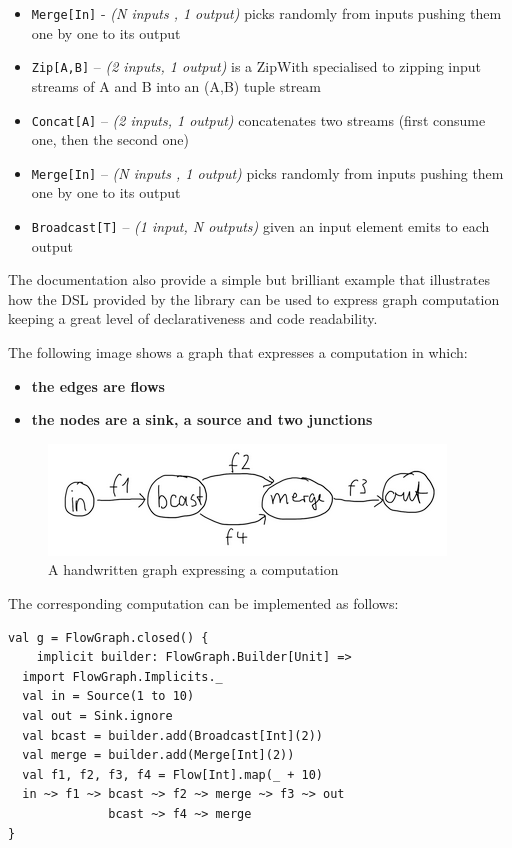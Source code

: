 \begin{itemize}
\itemsep1pt\parskip0pt
\item
  \texttt{Merge{[}In{]}} - \emph{(N inputs , 1 output)} picks randomly
  from inputs pushing them one by one to its output
\item
  \texttt{Zip{[}A,B{]}} -- \emph{(2 inputs, 1 output)} is a ZipWith
  specialised to zipping input streams of A and B into an (A,B) tuple
  stream
\item
  \texttt{Concat{[}A{]}} -- \emph{(2 inputs, 1 output)} concatenates two
  streams (first consume one, then the second one)
\item
  \texttt{Merge{[}In{]}} -- \emph{(N inputs , 1 output)} picks randomly
  from inputs pushing them one by one to its output
\item
  \texttt{Broadcast{[}T{]}} -- \emph{(1 input, N outputs)} given an
  input element emits to each output
\end{itemize}

The documentation also provide a simple but brilliant example that
illustrates how the DSL provided by the library can be used to express
graph computation keeping a great level of declarativeness and code
readability.

The following image shows a graph that expresses a computation in which:

\begin{itemize}
\itemsep1pt\parskip0pt
\item
  \textbf{the edges are flows}
\item
  \textbf{the nodes are a sink, a source and two junctions}
\end{itemize}

\begin{figure}[htbp]
\centering
\includegraphics[scale=0.75]{imgs/graph.png}
\caption{A handwritten graph expressing a computation}
\end{figure}

The corresponding computation can be implemented as follows:

\begin{verbatim}
val g = FlowGraph.closed() { 
	implicit builder: FlowGraph.Builder[Unit] =>
  import FlowGraph.Implicits._
  val in = Source(1 to 10)
  val out = Sink.ignore
  val bcast = builder.add(Broadcast[Int](2))
  val merge = builder.add(Merge[Int](2))
  val f1, f2, f3, f4 = Flow[Int].map(_ + 10)
  in ~> f1 ~> bcast ~> f2 ~> merge ~> f3 ~> out
              bcast ~> f4 ~> merge
}
\end{verbatim}

